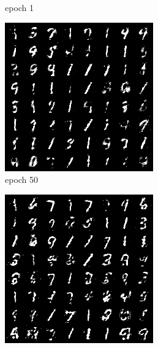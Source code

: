 \documentclass[a4paper]{article}
\theoremstyle{definition}
\newenvironment{soln}{
	\leavevmode\color{blue}\ignorespaces
}{}
\begin{document}
\begin{enumerate} [label=(\alph*)]
\begin{soln}
\begin{figure}[H]
\begin{subfigure}[b]{0.3\textwidth}
				      \caption{epoch 1}
			      \end{subfigure}
			      \hfill
			      \begin{subfigure}[b]{0.3\textwidth}
				      \centering
				      \includegraphics[width=\textwidth]{img/q1_3/gen_img50.png}
				      \caption{epoch 50}
			      \end{subfigure}
			      \hfill
			      \begin{subfigure}[b]{0.3\textwidth}
				      \centering
				      \includegraphics[width=\textwidth]{img/q1_3/gen_img100.png}

\end{subfigure}
\end{figure}
\end{soln}
\end{enumerate}
\end{document}
